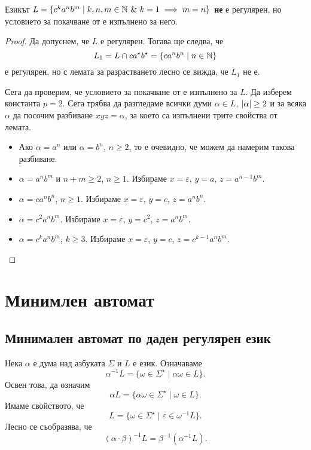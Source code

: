 \begin{example}
  Езикът $L = \{c^ka^nb^m\mid k,n,m \in \Nat\ \&\ k = 1\implies m = n\}$
  {\bf не} е регулярен, но условието за покачване от  е изпълнено за него.
\end{example}
\begin{proof}
  Да допуснем, че $L$ е регулярен.
  Тогава ще следва, че 
  \[L_1 = L\cap ca^\star b^\star = \{ca^nb^n \mid n\in\mathbb{N}\}\]
  е регулярен,
  но с лемата за разрастването лесно се вижда, че $L_1$ не е.

  Сега да проверим, че условието за покачване от  е изпълнено за $L$.
  Да изберем константа $p = 2$.
  Сега трябва да разгледаме всички думи $\alpha \in L$, $\lvert{\alpha}\rvert \geq 2$
  и за всяка $\alpha$ да посочим разбиване $xyz = \alpha$, за което са изпълнени трите свойства от лемата.

  \begin{itemize}
  \item
    Ако $\alpha = a^n$ или $\alpha = b^n$, $n\geq 2$, то е  очевидно, че можем да
    намерим такова разбиване.
  \item
    $\alpha = a^nb^m$ и $n+m \geq 2$, $n \geq 1$.
    Избираме $x = \varepsilon$, $y = a$, $z = a^{n-1}b^m$.
  \item
    $\alpha = ca^nb^n$, $n\geq 1$.
    Избираме $x = \varepsilon$, $y = c$, $z = a^nb^n$.
  \item
    $\alpha = c^2a^nb^m$. 
    Избираме $x = \varepsilon$, $y = c^2$, $z = a^nb^m$.
  \item
    $\alpha = c^ka^nb^m$, $k \geq 3$.
    Избираме $x = \varepsilon$, $y = c$, $z = c^{k-1}a^nb^m$.
  \end{itemize}
\end{proof}

\section{Минимлен автомат}

\subsection{Минимален автомат по даден регулярен език}
Нека $\alpha$ е дума над азбуката $\Sigma$  и $L$ е език. Означаваме 
\[\alpha^{-1}L = \{\omega \in \Sigma^\star \mid \alpha\omega \in L\}.\]
Освен това, да означим 
\[\alpha L = \{\alpha\omega \in \Sigma^\star \mid \omega \in L\}.\]
Имаме свойството, че
\[L = \{\omega \in \Sigma^\star \mid \varepsilon \in \omega^{-1}L\}.\]
Лесно се съобразява, че 
\[(\alpha\cdot\beta)^{-1}L = \beta^{-1}(\alpha^{-1}L).\]

